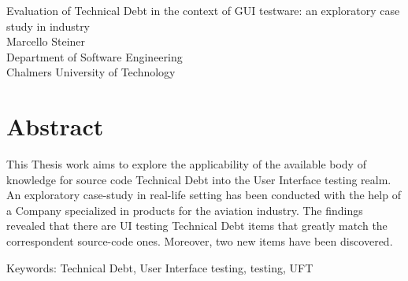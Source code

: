 Evaluation of Technical Debt in the context of GUI testware: an exploratory case study in industry\\
Marcello Steiner\\
Department of Software Engineering\\
Chalmers University of Technology\\

\thispagestyle{plain}			%
\section*{Abstract}
This Thesis work aims to explore the applicability of the available body of knowledge for source code Technical Debt into the User Interface testing realm. An exploratory case-study in real-life setting has been conducted with the help of a Company specialized in products for the aviation industry. The findings revealed that there are UI testing Technical Debt items that greatly match the correspondent source-code ones. Moreover, two new items have been discovered.

\vfill
Keywords: Technical Debt, User Interface testing, testing, UFT

\newpage				%
\thispagestyle{empty}
\mbox{}